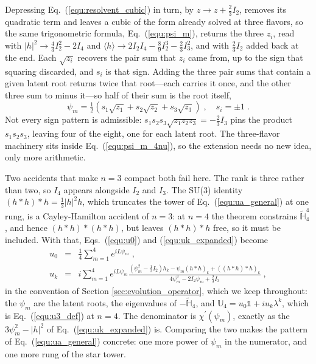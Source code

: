 \documentclass[final,5p,times,twocolumn,sort,compress]{elsarticle}
\newcommand{\eq}{Eq.}
\newcommand{\equ}[1]{\eq~(\ref{equ:#1})}
\begin{document}
Depressing \equ{resolvent_cubic} in turn, by $z \to z + \frac{2}{3}I_2$, removes its quadratic term and leaves a cubic of the form already solved at three flavors, so the same trigonometric formula, \equ{psi_m}, returns the three $z_i$, read with $\lvert h \rvert^2 \to \frac{4}{3}I_2^2 - 2I_4$ and $\langle h \rangle \to 2I_2I_4 - \frac{8}{9}I_2^3 - \frac{2}{3}I_3^2$, and with $\frac{2}{3}I_2$ added back at the end.  Each $\sqrt{z_i}$ recovers the pair sum that $z_i$ came from, up to the sign that squaring discarded, and $s_i$ is that sign.  Adding the three pair sums that contain a given latent root returns twice that root---each carries it once, and the other three sum to minus it---so half of their sum is the root itself,
\begin{equation}
 \label{equ:psi_m_4nu}
 \psi_m = \tfrac{1}{2}\left(s_1\sqrt{z_1}+s_2\sqrt{z_2}+s_3\sqrt{z_3}\right) \;,
 \quad
 s_i = \pm 1 \;.
\end{equation}
Not every sign pattern is admissible: $s_1s_2s_3\sqrt{z_1z_2z_3} = -\frac{2}{3}I_3$ pins the product $s_1s_2s_3$, leaving four of the eight, one for each latent root.  The three-flavor machinery sits inside \equ{psi_m_4nu}, so the extension needs no new idea, only more arithmetic.

Two accidents that make $n=3$ compact both fail here.  The rank is three rather than two, so $I_4$ appears alongside $I_2$ and $I_3$.  The SU(3) identity $\left(h \ast h\right) \ast h = \frac{1}{3}\lvert h \rvert^2 h$, which truncates the tower of \equ{ua_general} at one rung, is a Cayley-Hamilton accident of $n=3$: at $n=4$ the theorem constrains $\tilde{\mathbb{H}}_4^4$, and hence $(h \ast h) \ast (h \ast h)$, but leaves $(h \ast h) \ast h$ free, so it must be included.  With that, Eqs.\ (\ref{equ:u0}) and (\ref{equ:uk_expanded}) become
\begin{eqnarray}
 \label{equ:u0_4nu}
 \!\!\!\!\!\!\!\!\!\!
 u_0
 \!\!\!\!&=&\!\!\!\!
 \frac{1}{4}\sum_{m=1}^4 e^{iL\psi_m} \;, \\
 \label{equ:uk_4nu}
 \!\!\!\!\!\!\!\!\!\!
 u_k
 \!\!\!\!&=&\!\!\!\!
 i\sum_{m=1}^4
 e^{iL\psi_m}
 \frac{\left(\psi_m^2 - \frac{1}{2}I_2\right)h_k - \psi_m \left(h \ast h\right)_k + \left(\left(h \ast h\right)\ast h\right)_k}
      {4\psi_m^3 - 2I_2\psi_m + \frac{2}{3}I_3} \;,
\end{eqnarray}
in the convention of Section \ref{sec:evolution_operator}, which we keep throughout: the $\psi_m$ are the latent roots, the eigenvalues of $-\tilde{\mathbb{H}}_4$, and $\mathbb{U}_4 = u_0\mathbb{1} + iu_k\lambda^k$, which is \equ{u3_def} at $n = 4$.  The denominator is $\chi^\prime(\psi_m)$, exactly as the $3\psi_m^2 - \lvert h \rvert^2$ of \equ{uk_expanded} is.  Comparing the two makes the pattern of \equ{ua_general} concrete: one more power of $\psi_m$ in the numerator, and one more rung of the star tower.
\end{document}
